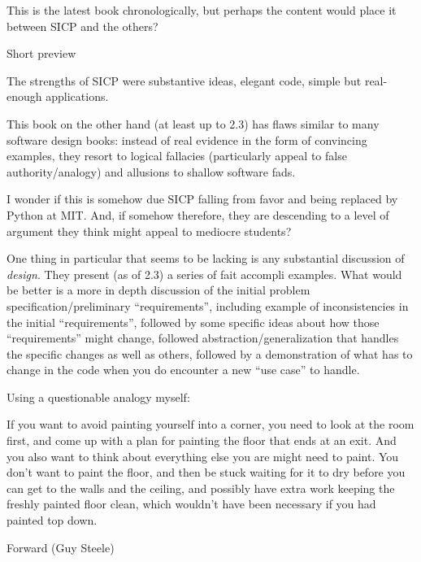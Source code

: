 \documentclass[12pt]{PalisadesLakesBook}
\begin{document}
\begin{plSection}{}
This is the latest book chronologically,
but perhaps the content would place it between SICP
and the others?
\begin{plSection}{Short preview}

The strengths of SICP were substantive ideas, elegant code,
simple but real-enough applications.

This book on the other hand (at least up to 2.3)
has flaws similar to many software design books:
instead of real evidence in the form of convincing examples,
they resort to logical fallacies (particularly appeal to
false authority/analogy)
and allusions to shallow software fads.

I wonder if this is somehow due SICP falling from favor
and being replaced by Python at MIT.
And, if somehow therefore, they are descending to a level of
argument they think might appeal to mediocre students?

One thing in particular that seems to be lacking is 
any substantial discussion of \emph{design}.
They present (as of 2.3) a series of fait accompli examples.
What would be better is a more in depth discussion 
of the initial problem specification/preliminary ``requirements'',
including example of inconsistencies 
in the initial ``requirements'',
followed by some specific ideas about how those ``requirements''
might change,
followed abstraction/generalization that handles the specific
changes as well as others,
followed by a demonstration of what has to change in the code
when you do encounter a new ``use case'' to handle.

Using a questionable analogy myself:

If you want to avoid painting yourself into a corner,
you need to look at the room first, and come up with a plan
for painting the floor that ends at an exit.
And you also want to think about everything else 
you are might need to paint. 
You don't want to paint the floor,
and then be stuck waiting for it to dry before you can get
to the walls and the ceiling,
and possibly have extra work keeping the freshly painted floor
clean, which wouldn't have been necessary if you had painted
top down.

\end{plSection}%
\begin{plSection}{Forward (Guy Steele)}


\end{plSection}
\end{plSection}
\end{document}
